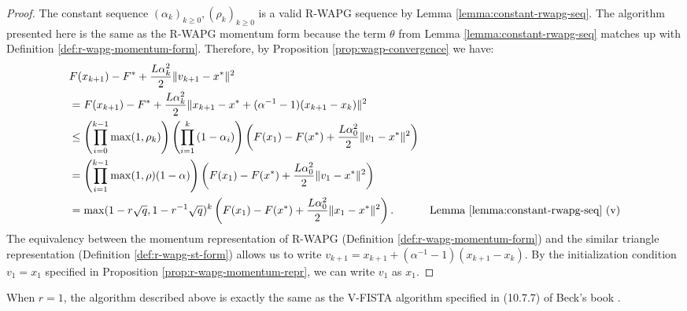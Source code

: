 \documentclass[12pt]{article}
\begin{document}
    \begin{proof}
        The constant sequence $(\alpha_k)_{k \ge 0}, (\rho_k)_{k \ge 0}$ is a valid R-WAPG sequence by Lemma \ref{lemma:constant-rwapg-seq}. 
        The algorithm presented here is the same as the R-WAPG momentum form because the term $\theta$ from Lemma \ref{lemma:constant-rwapg-seq} matches up with Definition \ref{def:r-wapg-momentum-form}. 
        Therefore, by Proposition \ref{prop:wagp-convergence} we have: 
        \begin{align*}
            & F(x_{k + 1}) - F^* + \frac{L\alpha_k^2}{2}\Vert v_{k + 1} - x^*\Vert^2
            \\
            &= 
            F(x_{k + 1}) - F^* + \frac{L\alpha_k^2}{2}\Vert x_{k + 1}  - x^* + (\alpha^{-1} - 1)(x_{k + 1} - x_k)\Vert^2
            \\
            &\le 
            \left(
                \prod_{i = 0}^{k - 1} \max(1, \rho_{k})
            \right)
            \left(
                \prod_{i = 1}^{k} \left(1  - \alpha_i\right)
            \right)
            \left(
                F(x_1) - F(x^*) + \frac{L\alpha_0^2}{2}\Vert v_1 - x^*\Vert^2
            \right)
            \\
            &= \left(
                \prod_{i = 1}^{k - 1} \max(1, \rho)(1 - \alpha)
            \right)
            \left(
                F(x_1) - F(x^*) + \frac{L\alpha_0^2}{2}\Vert v_1 - x^*\Vert^2
            \right)
            \\
            &= \max(1 - r\sqrt{q}, 1 - r^{-1}\sqrt{q})^k
            \left(
                F(x_1) - F(x^*) + \frac{L\alpha_0^2}{2}\Vert x_1 - x^*\Vert^2
            \right). 
            & \text{Lemma \ref{lemma:constant-rwapg-seq} (v)}
        \end{align*}
        The equivalency between the momentum representation of R-WAPG (Definition \ref{def:r-wapg-momentum-form}) and the similar triangle representation (Definition \ref{def:r-wapg-st-form}) allows us to write $v_{k + 1} = x_{k + 1} + (\alpha^{-1} - 1)(x_{k + 1} - x_k)$. 
        By the initialization condition $v_1 = x_1$ specified in Proposition \ref{prop:r-wapg-momentum-repr}, we can write $v_1$ as $x_1$. 
    \end{proof}
    \begin{remark}
        When $r = 1$, the algorithm described above is exactly the same as the V-FISTA algorithm specified in (10.7.7) of Beck's book \cite{beck_first-order_2017}. 
    \end{remark}
\end{document}
